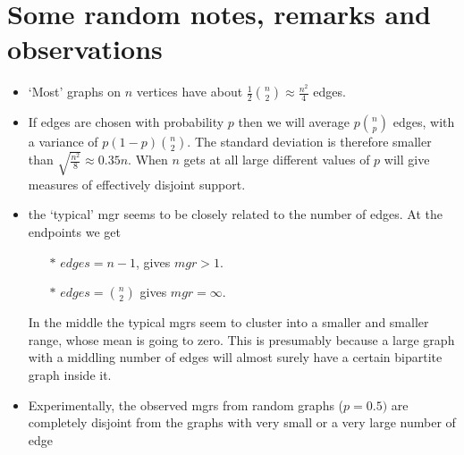 \documentclass[12pt]{article}
\begin{document}
\newcommand{\bs}{\boldsymbol}
\newcommand{\Cov}{\text{Cov}}


\section*{Some random notes, remarks and observations}

\begin{itemize}

\item `Most' graphs on $n$ vertices have about $\frac{1}{2} \binom{n}{2} \approx \frac{n^2}{4}$ edges.

\item If edges are chosen with probability $p$ then we will average $p \binom{n}{p}$ edges, with a variance of $p(1-p) \binom{n}{2}$. The standard deviation is therefore smaller than $\sqrt{\frac{n^2}{8}} \approx 0.35 n$.  When $n$ gets at all large different values of $p$ will give measures of effectively disjoint support.

\item the `typical' mgr seems to be closely related to the number of edges.  At the endpoints we get
   \begin{itemize}  %
     \item[$*$] $edges = n-1$, gives $mgr > 1$.
     \item[$*$] $edges = \binom{n}{2}$ gives $mgr = \infty$.
   \end{itemize}
   In the middle the typical mgrs seem to cluster into a smaller and smaller range, whose mean is going to zero. This is presumably because a large graph with a middling number of edges will almost surely have a certain bipartite graph inside it.

\item Experimentally, the observed mgrs from random graphs ($p = 0.5)$ are completely disjoint from the graphs with very small or a very large number of edge


\end{itemize}
\end{document}
